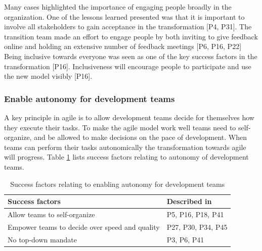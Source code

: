 





Many cases highlighted the importance of engaging people broadly in the
organization.
One of the lessons learned presented was that it is important to involve all
stakeholders to gain acceptance in the transformation [P4, P31]. The transition
team made an effort to engage people by both inviting to give feedback online
and holding an extensive number of feedback meetings [P6, P16, P22] Being
inclusive towards everyone was seen as one of the key success factors in the
transformation [P16]. Inclusiveness will encourage people to participate and use
the new model visibly [P16].


\subsubsection{Enable autonomy for development teams}

A key principle in agile is to allow development teams decide for themselves how
they execute their tasks. To make the agile model work well teams need to
self-organize, and be allowed to make decisions on the pace of development.
When teams can perform their tasks autonomically the transformation towards
agile will progress.
Table \ref{table:success_autonomy} lists success factors relating to autonomy of
development teams.

\begin{table}[h]
    \centering
    \begin{tabular}{ >{\raggedright\arraybackslash}p{}
                     >{\raggedright\arraybackslash}p{} }
        \toprule
        Success factors  &  Described in \\
        \midrule
        Allow teams to self-organize  &
                P5, P16, P18, P41  \\
        Empower teams to decide over speed and quality  &
                P27, P30, P34, P45  \\
        No top-down mandate  &
                P3, P6, P41  \\
        \bottomrule
    \end{tabular}
    \caption{Success factors relating to enabling autonomy for development teams}
    \label{table:success_autonomy}
\end{table}

